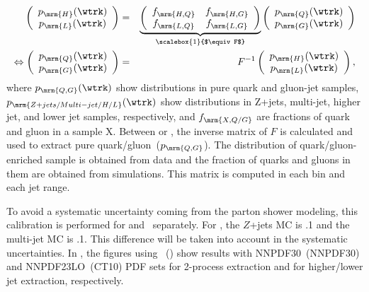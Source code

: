 \begin{eqnarray}
\label{eq:QG-matrix2}
\left(\begin{array}{c} 
    p_{\mrm{H}}(\wtrk)\\ 
    p_{\mrm{L}}(\wtrk)\\ 
    \end{array}\right)
    &=&
    \underbrace{
\left(\begin{array}{cc}
    f_{\mrm{H,Q}}&f_{\mrm{H,G}}\\
    f_{\mrm{L,Q}}&f_{\mrm{L,G}}\\
    \end{array}\right)
  }_{\scalebox{1}{$\equiv F$}}
\left(\begin{array}{c} 
    p_\mrm{Q}(\wtrk)\\ 
    p_\mrm{G}(\wtrk)\\ 
    \end{array}\right)
    \\
\label{eq:QG-invmatrix2}
\Leftrightarrow
\left(\begin{array}{c} 
    p_\mrm{Q}(\wtrk)\\ 
    p_\mrm{G}(\wtrk)\\ 
    \end{array}\right)
    &=& F^{-1}
\left(\begin{array}{c} 
    p_{\mrm{H}}(\wtrk)\\ 
    p_{\mrm{L}}(\wtrk)\\ 
    \end{array}\right),
\end{eqnarray}
where $p_{\mrm{Q,G}}(\wtrk)$ show \wtrk distributions in pure quark and gluon-jet samples, 
$p_{\mrm{Z+jets/Multi-jet/H/L}}(\wtrk)$ show \wtrk distributions in Z+jets, multi-jet, higher \abseta jet, and lower \abseta jet samples, respectively, 
and $f_{\mrm{X,Q/G}}$ are fractions of quark and gluon in a sample X. %
Between  or , %
the inverse matrix of $F$ is calculated and used to extract pure quark/gluon~($p_{\mrm{Q,G}}$). %
The distribution of quark/gluon-enriched sample is obtained from data and the fraction of quarks and gluons in them are obtained from simulations. %
This matrix is computed in each \wtrk bin and each jet \pt range.

To avoid a systematic uncertainty coming from the parton shower modeling, %
this calibration is performed for  and \sherpa~separately. %
For \sherpa, the $Z$+jets MC is .1 and the multi-jet MC is .1. %
This difference will be taken into account in the systematic uncertainties. %
In , the figures using ~(\sherpa) show results %
with  NNPDF30~(NNPDF30) and NNPDF23LO~(CT10) PDF sets for 2-process extraction and for higher/lower \abseta jet extraction, respectively. %

